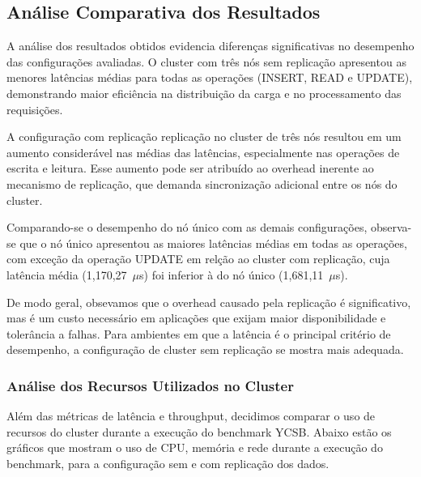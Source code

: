 \subsection{Análise Comparativa dos Resultados}

A análise dos resultados obtidos evidencia diferenças significativas no desempenho das configurações avaliadas.
O cluster com três nós sem replicação apresentou as menores latências médias para todas as operações (INSERT, READ e UPDATE),
demonstrando maior eficiência na distribuição da carga e no processamento das requisições.

A configuração com replicação replicação no cluster de três nós resultou em um aumento considerável nas médias das latências,
especialmente nas operações de escrita e leitura. 
Esse aumento pode ser atribuído ao overhead inerente ao mecanismo de replicação, que demanda sincronização adicional entre os nós do cluster.

Comparando-se o desempenho do nó único com as demais configurações,
observa-se que o nó único apresentou as maiores latências médias em todas as operações, 
com exceção da operação UPDATE em relção ao cluster com replicação, cuja latência média (1,170,27~$\mu$s) foi inferior à do nó único (1,681,11~$\mu$s).

De modo geral, obsevamos que o overhead causado pela replicação é significativo,
mas é um custo necessário em aplicações que exijam maior disponibilidade e tolerância a falhas.
Para ambientes em que a latência é o principal critério de desempenho, a configuração de cluster sem replicação se mostra mais adequada.

\subsubsection{Análise dos Recursos Utilizados no Cluster}
Além das métricas de latência e throughput, decidimos comparar o uso de recursos do cluster durante a execução do benchmark YCSB.
Abaixo estão os gráficos que mostram o uso de CPU, memória e rede durante a execução do benchmark, para a configuração sem e com replicação dos dados.

